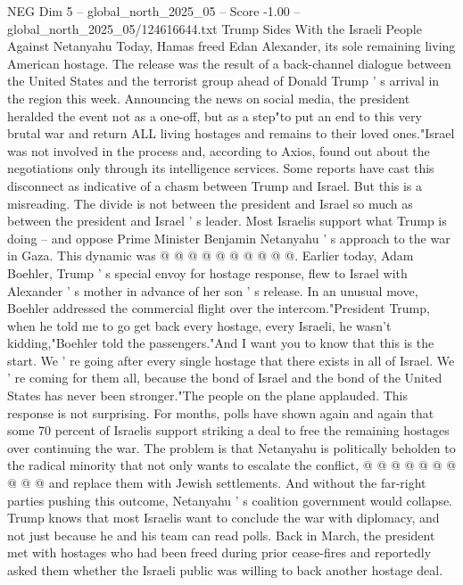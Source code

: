 \begin{textsample}{NEG Dim 5 – global\_north\_2025\_05 – Score -1.00 – global\_north\_2025\_05/124616644.txt}  \label{ex:f5_neg_325}
Trump Sides With the Israeli People Against Netanyahu Today, Hamas freed Edan Alexander, its sole remaining living American hostage.
The release was the result of a back-channel dialogue between the United States and the terrorist group ahead of Donald Trump ' s arrival in the region this week.
Announcing the news on social media, the president heralded the event not as a one-off, but as a step"to put an end to this very brutal war and return ALL living hostages and remains to their loved ones."Israel was not involved in the process and, according to Axios, found out about the negotiations only through its intelligence services.
Some reports have cast this disconnect as indicative of a chasm between Trump and Israel.
But this is a misreading.
The divide is not between the president and Israel so much as between the president and Israel ' s leader.
Most Israelis support what Trump is doing -- and oppose Prime Minister Benjamin Netanyahu ' s approach to the war in Gaza.
This dynamic was @ @ @ @ @ @ @ @ @ @.
Earlier today, Adam Boehler, Trump ' s special envoy for hostage response, flew to Israel with Alexander ' s mother in advance of her son ' s release.
In an unusual move, Boehler addressed the commercial flight over the intercom."President Trump, when he told me to go get back every hostage, every Israeli, he wasn't kidding,"Boehler told the passengers."And I want you to know that this is the start.
We ' re going after every single hostage that there exists in all of Israel.
We ' re coming for them all, because the bond of Israel and the bond of the United States has never been stronger."The people on the plane applauded.
This response is not surprising.
For months, polls have shown again and again that some 70 percent of Israelis support striking a deal to free the remaining hostages over continuing the war.
The problem is that Netanyahu is politically beholden to the radical minority that not only wants to escalate the conflict, @ @ @ @ @ @ @ @ @ @ and replace them with Jewish settlements.
And without the far-right parties pushing this outcome, Netanyahu ' s coalition government would collapse.
Trump knows that most Israelis want to conclude the war with diplomacy, and not just because he and his team can read polls.
Back in March, the president met with hostages who had been freed during prior cease-fires and reportedly asked them whether the Israeli public was willing to back another hostage deal.

\end{textsample}
